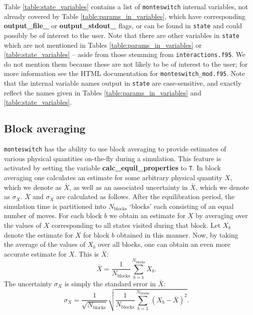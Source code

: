 \documentclass{report}
\begin{document}
Table \ref{table:state_variables} contains a list of \texttt{monteswitch} internal variables, not already covered by Table \ref{table:params_in_variables},
which have corresponding \textbf{output\_file\_} or \textbf{output\_stdout\_} flags, or can be found in \texttt{state} and could possibly be of interest
to the user. Note that there are other variables in \texttt{state} which are not mentioned in Tables \ref{table:params_in_variables} or 
\ref{table:state_variables} -- aside from those stemming from \texttt{interactions.f95}. We do not mention them because these are not likely to be of
interest to the user; for more information see the HTML documentation for \texttt{monteswitch\_mod.f95}.
Note that the internal variable names output in \texttt{state} are case-sensitive, and exactly reflect the names given in Tables 
\ref{table:params_in_variables} and \ref{table:state_variables}.

\subsection{Block averaging}\label{sec:block_averaging}
\texttt{monteswitch} has the ability to use block averaging to provide estimates of various physical quantities on-the-fly during a simulation. 
This feature is activated by setting the variable \textbf{calc\_equil\_properties} to \texttt{T}.
In block averaging one calculates an estimate for some arbitrary physical quantity $X$, which we denote as $\bar{X}$, as well as an associated
uncertainty in $\bar{X}$, which we denote as $\sigma_X$. $\bar{X}$ and $\sigma_X$ are calculated as follows.
After the equilibration period, the simulation time is partitioned into $N_{\text{blocks}}$ `blocks' each consisting of an equal number of 
moves.
For each block $b$ we obtain an estimate for $X$ by averaging over the values of $X$ corresponding to all states visited during that block. 
Let $X_b$ denote the estimate for $X$ for block $b$ obtained in this manner. Now, by taking the average of the values of $X_b$ over all blocks, one can 
obtain an even more accurate estimate for $X$. This is $\bar{X}$: 
\begin{equation}
\bar{X}=\frac{1}{N_{\text{blocks}}}\sum_{b=1}^{N_{\text{blocks}}}X_b.
\end{equation}
The uncertainty $\sigma_X$ is simply the standard error in $\bar{X}$:
\begin{equation}
\sigma_X=\frac{1}{\sqrt{N_{\text{blocks}}}}\sqrt{\frac{1}{N_{\text{blocks}}}\sum_{b=1}^{N_{\text{blocks}}}(X_b-\bar{X})^2}.
\end{equation}
\end{document}
